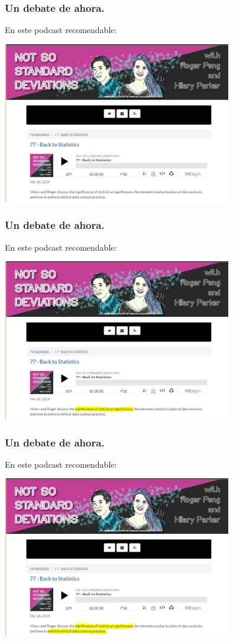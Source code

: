 \documentclass[9pt]{beamer}
\begin{document}
\begin{frame}
  \frametitle{Un debate de ahora.}
  En este podcast recomendable:\\ 
  \begin{center}
  \includegraphics[width=10cm]{images/nssd_1}
  \end{center}
\end{frame}


\begin{frame}
  \frametitle{Un debate de ahora.}
  En este podcast recomendable:\\ 
  \begin{center}
  \includegraphics[width=10cm]{images/nssd_2}
  \end{center}
\end{frame}


\begin{frame}
  \frametitle{Un debate de ahora.}
  En este podcast recomendable:\\ 
  \begin{center}
  \includegraphics[width=10cm]{images/nssd_3}
  \end{center}
\end{frame}
\end{document}
